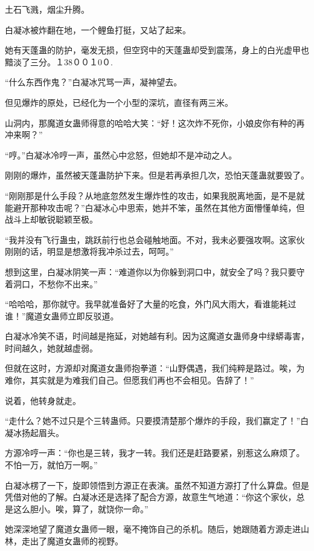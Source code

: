 
\begin{this_body}

土石飞溅，烟尘升腾。

白凝冰被炸翻在地，一个鲤鱼打挺，又站了起来。

她有天蓬蛊的防护，毫发无损，但空窍中的天蓬蛊却受到震荡，身上的白光虚甲也黯淡了三分。１38００１0０.

“什么东西作鬼？”白凝冰咒骂一声，凝神望去。

但见爆炸的原处，已经化为一个小型的深坑，直径有两三米。

山洞内，那魔道女蛊师得意的哈哈大笑：“好！这次炸不死你，小娘皮你有种的再冲来啊？”

“哼。”白凝冰冷哼一声，虽然心中忿怒，但她却不是冲动之人。

刚刚的爆炸，虽然被天蓬蛊防护下来。但是若再承担几次，恐怕天蓬蛊就要毁了。

“刚刚那是什么手段？从地底忽然发生爆炸性的攻击，如果我脱离地面，是不是就能避开那种攻击呢？”白凝冰心中思索，她并不笨，虽然在其他方面懵懂单纯，但战斗上却敏锐聪颖至极。

“我并没有飞行蛊虫，跳跃前行也总会碰触地面。不对，我未必要强攻啊。这家伙刚刚的话，明显是想激将我冲杀过去，呵呵。”

想到这里，白凝冰阴笑一声：“难道你以为你躲到洞口中，就安全了吗？我只要守着洞口，不愁你不出来。”

“哈哈哈，那你就守。我早就准备好了大量的吃食，外门风大雨大，看谁能耗过谁！”魔道女蛊师立即反驳道。

白凝冰冷笑不语，时间越是拖延，对她越有利。因为这魔道女蛊师身中绿蟒毒害，时间越久，她就越虚弱。

但就在这时，方源却对魔道女蛊师抱拳道：“山野偶遇，我们纯粹是路过。唉，为难你，其实就是为难我们自己。但愿我们再也不会相见。告辞了！”

说着，他转身就走。

“走什么？她不过只是个三转蛊师。只要摸清楚那个爆炸的手段，我们赢定了！”白凝冰扬起眉头。

方源冷哼一声：“你也是三转，我才一转。我们还是赶路要紧，别惹这么麻烦了。不怕一万，就怕万一啊。”

白凝冰楞了一下，旋即领悟到方源正在表演。虽然不知道方源打了什么算盘。但是凭借对他的了解。白凝冰还是选择了配合方源，故意生气地道：“你这个家伙，总是这么胆小。唉，算了，就饶你一命。”

她深深地望了魔道女蛊师一眼，毫不掩饰自己的杀机。随后，她跟随着方源走进山林，走出了魔道女蛊师的视野。


\end{this_body}
